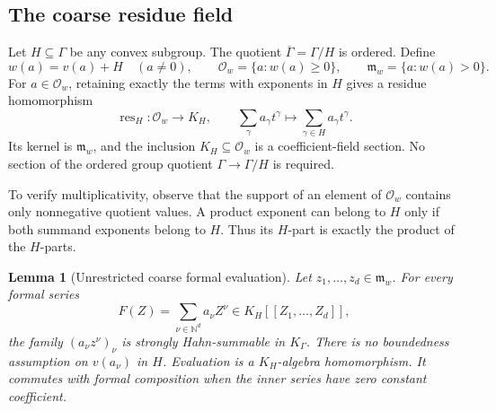 \documentclass[11pt,letterpaper]{article}
\newtheorem{lemma}[lemma]{Lemma}
\theoremstyle{definition}
\newcommand{\N}{\mathbb N}
\newcommand{\res}{\operatorname{res}}
\newcommand{\m}{\mathfrak m}
\newcommand{\OO}{\mathcal O}
\begin{document}
\subsection{The coarse residue field}

Let $H\subseteq\Gamma$ be any convex subgroup. The quotient
$\overline\Gamma=\Gamma/H$ is ordered. Define
\[
 w(a)=v(a)+H\quad(a\ne0),\qquad
 \OO_w=\{a:w(a)\ge0\},\qquad
 \m_w=\{a:w(a)>0\}.
\]
For $a\in\OO_w$, retaining exactly the terms with exponents in $H$
gives a residue homomorphism
\begin{equation}
 \res_H:\OO_w\longrightarrow K_H,\qquad
 \sum_\gamma a_\gamma t^\gamma\longmapsto
             \sum_{\gamma\in H}a_\gamma t^\gamma.\label{tate:eq:resH}
\end{equation}
Its kernel is $\m_w$, and the inclusion $K_H\subseteq\OO_w$ is a
coefficient-field section. No section of the ordered group quotient
$\Gamma\to\Gamma/H$ is required.

To verify multiplicativity, observe that the support of an element of
$\OO_w$ contains only nonnegative quotient values. A product exponent
can belong to $H$ only if both summand exponents belong to $H$. Thus its
$H$-part is exactly the product of the $H$-parts.

\begin{lemma}[Unrestricted coarse formal evaluation]\label{tate:lem:coarse-eval}
Let $z_1,\ldots,z_d\in\m_w$. For every formal series
\[
 F(Z)=\sum_{\nu\in\N^d}a_\nu Z^\nu\in K_H[[Z_1,\ldots,Z_d]],
\]
the family $(a_\nu z^\nu)_\nu$ is strongly Hahn-summable in $K_\Gamma$.
There is no boundedness assumption on $v(a_\nu)$ in $H$.
Evaluation is a $K_H$-algebra homomorphism. It commutes with formal
composition when the inner series have zero constant coefficient.
\end{lemma}
\end{document}
